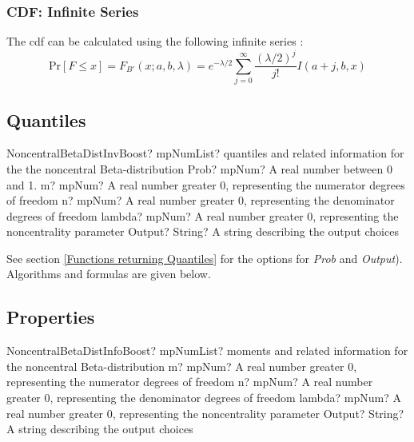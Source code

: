 \label{NoncentralBetaDistributionCDF}

\subsubsection{CDF: Infinite Series}
The cdf can be calculated using the following infinite series \cite{Benton_2003}:
\begin{equation}
	\text{Pr}[F \leq x] = F_{B'}(x;a,b,\lambda) = e^{-\lambda/2} \sum_{j=0}^{\infty}{\frac{(\lambda/2)^j}{j!}I(a+j,b,x)}
\end{equation}



\subsection{Quantiles}

\begin{mpFunctionsExtract}
	\mpFunctionFiveNotImplemented
	{NoncentralBetaDistInvBoost? mpNumList? quantiles and related information for the the noncentral Beta-distribution}
	{Prob? mpNum? A real number between 0 and 1.}
	{m? mpNum? A real number greater 0, representing the numerator  degrees of freedom}
	{n? mpNum? A real number greater 0, representing the denominator degrees of freedom}
	{lambda? mpNum? A real number greater 0, representing the noncentrality parameter}
	{Output? String? A string describing the output choices}
\end{mpFunctionsExtract}

See section \ref{Functions returning Quantiles} for the options for  {\itshape\sffamily Prob} and {\itshape\sffamily Output}). Algorithms and formulas are given below.




\subsection{Properties}
\label{NoncentralBetaDistributionProperties}


\begin{mpFunctionsExtract}
	\mpFunctionFourNotImplemented
	{NoncentralBetaDistInfoBoost? mpNumList? moments and related information for the noncentral Beta-distribution}
	{m? mpNum? A real number greater 0, representing the numerator  degrees of freedom}
	{n? mpNum? A real number greater 0, representing the denominator degrees of freedom}
	{lambda? mpNum? A real number greater 0, representing the noncentrality parameter}
	{Output? String? A string describing the output choices}
\end{mpFunctionsExtract}

